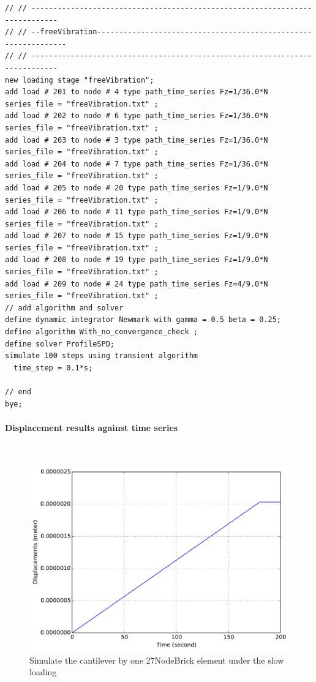 \begin{lstlisting}
// // ----------------------------------------------------------------------------
// // --freeVibration---------------------------------------------------------------
// // ----------------------------------------------------------------------------
new loading stage "freeVibration";
add load # 201 to node # 4 type path_time_series Fz=1/36.0*N series_file = "freeVibration.txt" ; 
add load # 202 to node # 6 type path_time_series Fz=1/36.0*N series_file = "freeVibration.txt" ; 
add load # 203 to node # 3 type path_time_series Fz=1/36.0*N series_file = "freeVibration.txt" ; 
add load # 204 to node # 7 type path_time_series Fz=1/36.0*N series_file = "freeVibration.txt" ; 
add load # 205 to node # 20 type path_time_series Fz=1/9.0*N series_file = "freeVibration.txt" ; 
add load # 206 to node # 11 type path_time_series Fz=1/9.0*N series_file = "freeVibration.txt" ; 
add load # 207 to node # 15 type path_time_series Fz=1/9.0*N series_file = "freeVibration.txt" ; 
add load # 208 to node # 19 type path_time_series Fz=1/9.0*N series_file = "freeVibration.txt" ; 
add load # 209 to node # 24 type path_time_series Fz=4/9.0*N series_file = "freeVibration.txt" ; 
// add algorithm and solver
define dynamic integrator Newmark with gamma = 0.5 beta = 0.25;
define algorithm With_no_convergence_check ;
define solver ProfileSPD;
simulate 100 steps using transient algorithm 
  time_step = 0.1*s;

// end
bye;
\end{lstlisting}

\paragraph{Displacement results against time series} ~

\begin{figure}[!htb]
  \centering
  \includegraphics[width=12cm]{./Figure-files/_Chapter_Appendix_Illustrative_Examples/brick-mass-1element-slowLoading.pdf}
  \caption{Simulate the cantilever by one 27NodeBrick element under the slow loading}
  \label{fig_27brick-mass-slow}
\end{figure}


